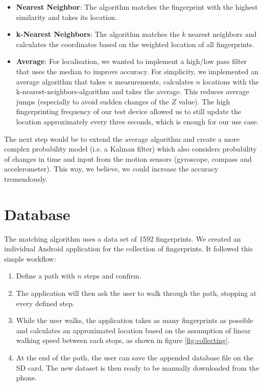 \documentclass{article}
\begin{document}
\begin{itemize}
    \item \textbf{Nearest Neighbor}: The algorithm matches the fingerprint with the highest similarity and takes its location.
    \item \textbf{k-Nearest Neighbors}: The algorithm matches the $k$ nearest neighbors and calculates the coordinates based on the weighted location of all fingerprints.
    \item \textbf{Average}: For localisation, we wanted to implement a high/low pass filter that uses the median to improve accuracy. For simplicity, we implemented an average algorithm that takes $n$ measurements, calculates $n$ locations with the k-nearest-neighbors-algorithm and takes the average. This reduces average jumps (especially to avoid sudden changes of the $Z$ value). The high fingerprinting frequency of our test device allowed us to still update the location approximately every three seconds, which is enough for our use case.
\end{itemize}

The next step would be to extend the average algorithm and create a more complex probability model (i.e. a Kalman filter) which also considers probability of changes in time and input from the motion sensors (gyroscope, compass and accelerometer). This way, we believe, we could increase the accuracy tremendously.

\section{Database}

The matching algorithm uses a data set of 1592 fingerprints. We created an individual Android application for the collection of fingerprints. It followed this simple workflow:

\begin{enumerate}
    \item Define a path with $n$ steps and confirm.
    \item The application will then ask the user to walk through the path, stopping at every defined step.
    \item While the user walks, the application takes as many fingerprints as possible and calculates an approximated location based on the assumption of linear walking speed between each stops, as shown in figure \ref{fig:collecting}.
    \item At the end of the path, the user can save the appended database file on the SD card. The new dataset is then ready to be manually downloaded from the phone.
\end{enumerate}
\end{document}

